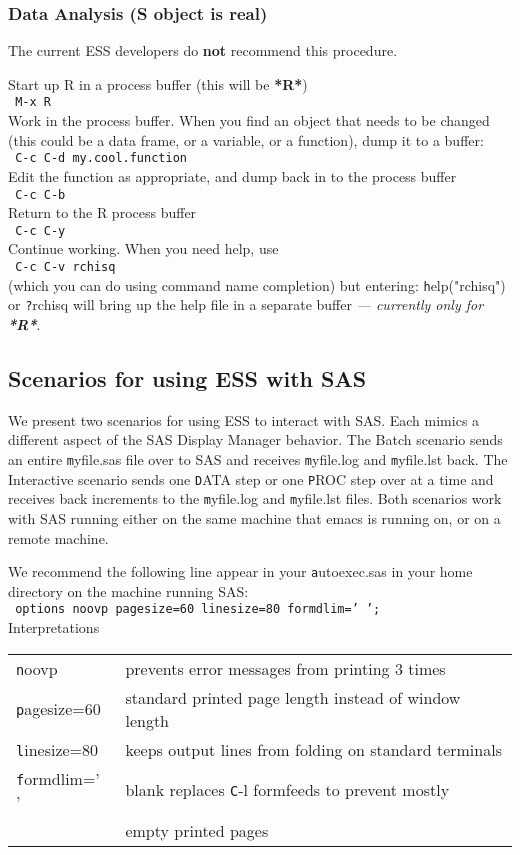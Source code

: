 \documentclass{article}
\newcommand{\elcode}[1]{\\{\texttt{\hspace*{2em} #1}}\\}
\begin{document}
\subsubsection{Data Analysis (S object is real)}
The current ESS developers do {\bf not} recommend this procedure.

\noindent
Start up R in a process buffer (this will be \textbf{*R*}) 
  \elcode{M-x R}
Work in the process buffer.  When you find an object that needs
to be changed (this could be a data frame, or a variable,
or a function), dump it to a buffer:
  \elcode{C-c C-d my.cool.function}
Edit the function as appropriate, and dump back in to the
process buffer
  \elcode{C-c C-b}
Return to the R process buffer
  \elcode{C-c C-y}
Continue working.
When you need help, use
  \elcode{C-c C-v rchisq}
(which you can do using command name completion)
but entering:   {\texttt help("rchisq")} or {\texttt ?rchisq}
will bring up the help file in a separate buffer
\emph{--- currently only for \textbf{*R*}}.



\subsection{Scenarios for using ESS with SAS}
\label{sec:SAS:scen}

We present two scenarios for using ESS to interact with SAS.  Each
mimics a different aspect of the SAS Display Manager behavior.  The
Batch scenario sends an entire {\texttt myfile.sas} file over to SAS
and receives {\texttt myfile.log} and {\texttt myfile.lst} back.  The
Interactive scenario sends one {\texttt DATA} step or one {\texttt
  PROC} step over at a time and receives back increments to the
{\texttt myfile.log} and {\texttt myfile.lst} files.  Both scenarios
work with SAS running either on the same machine that emacs is running
on, or on a remote machine.

We recommend the following line appear in your {\texttt autoexec.sas}
in your home directory on the machine running SAS: 
\elcode{options noovp pagesize=60 linesize=80 formdlim=' ';}
Interpretations\\
\begin{tabular}{ll}
\texttt   noovp         & prevents error messages from printing 3
                          times         \\ 
\texttt   pagesize=60   & standard printed page length instead of
                          window length \\ 
\texttt   linesize=80   & keeps output lines from folding on standard
                          terminals \\ 
\texttt   formdlim=' '  & blank replaces {\texttt C-l} formfeeds to
                          prevent mostly  \\ 
\texttt                 & empty printed pages                     \\
\end{tabular}\\
\end{document}
